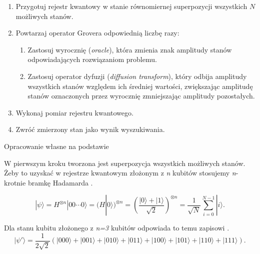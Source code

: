 \begin{algorithm}[H]
\caption{Algorytm Grovera}
\label{alg:grover}
\begin{enumerate}
    \item Przygotuj rejestr kwantowy w stanie równomiernej superpozycji wszystkich $N$ możliwych stanów.

    \item Powtarzaj operator Grovera odpowiednią liczbę razy:
    \begin{enumerate}
        \item Zastosuj wyrocznię (\textit{oracle}), która zmienia znak amplitudy stanów odpowiadających rozwiązaniom problemu.

        \item Zastosuj operator dyfuzji (\textit{diffusion transform}), który odbija amplitudy wszystkich stanów względem ich średniej wartości, zwiększając amplitudę stanów oznaczonych przez wyrocznię zmniejszając amplitudy pozostałych.
    \end{enumerate}

    \item Wykonaj pomiar rejestru kwantowego.
    \item Zwróć zmierzony stan jako wynik wyszukiwania.
\end{enumerate}
\begin{center}
\small Opracowanie własne na podstawie \cite{grover1996}
\end{center}
\end{algorithm}

W pierwszym kroku tworzona jest superpozycja wszystkich możliwych stanów.  Żeby to uzyskać w rejestrze kwantowym złożonym z \textit{n} kubitów stosujemy \textit{n}-krotnie bramkę Hadamarda \cite[s.~162, wz.~(4.66)]{inf_kwant}.

\begin{equation}
\label{eq:superposition}
|\psi\rangle = H^{\otimes n}|00\cdots0\rangle = (H|0\rangle)^{\otimes n} = \left( \frac{|0\rangle+|1\rangle}{\sqrt2} \right)^
{\otimes n} =\frac1{\sqrt N} \sum_{i=0}^{N-1}|i\rangle .
\end{equation}

\noindent
Dla stanu kubitu złożonego z \textit{n=3} kubitów odpowiada to temu zapisowi \cite[s.~278, wz~(5.366)]{inf_kwant}.
\begin{equation}
\label{eq:superposition_example}
|\psi'\rangle = \frac1{2\sqrt2} ( |000\rangle+ |001\rangle+ |010\rangle+ |011\rangle+ |100\rangle+ |101\rangle+ |110\rangle+ |111\rangle ).
\end{equation}

